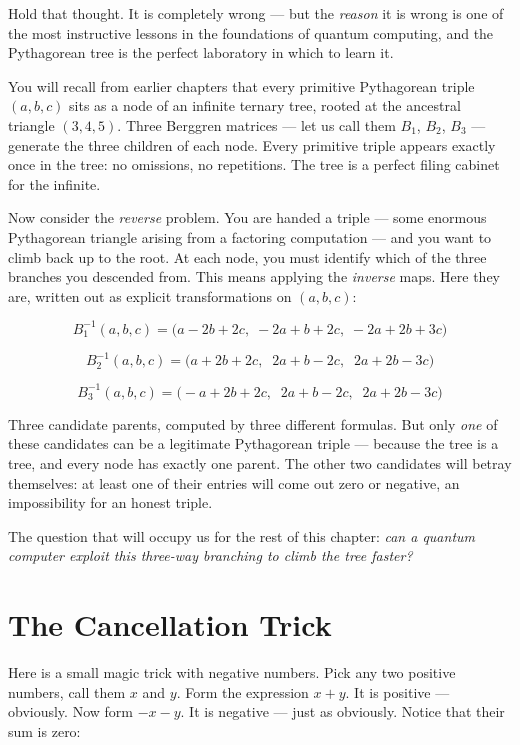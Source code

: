 \documentclass[11pt,twoside,openright]{book}
\theoremstyle{definition}
\theoremstyle{remark}
\begin{document}
Hold that thought. It is completely wrong --- but the \textit{reason} it is wrong is one of the most instructive lessons in the foundations of quantum computing, and the Pythagorean tree is the perfect laboratory in which to learn it.

You will recall from earlier chapters that every primitive Pythagorean triple $(a, b, c)$ sits as a node of an infinite ternary tree, rooted at the ancestral triangle $(3, 4, 5)$. Three Berggren matrices --- let us call them $B_1$, $B_2$, $B_3$ --- generate the three children of each node. Every primitive triple appears exactly once in the tree: no omissions, no repetitions. The tree is a perfect filing cabinet for the infinite.

Now consider the \textit{reverse} problem. You are handed a triple --- some enormous Pythagorean triangle arising from a factoring computation --- and you want to climb back up to the root. At each node, you must identify which of the three branches you descended from. This means applying the \textit{inverse} maps. Here they are, written out as explicit transformations on $(a, b, c)$:

\[B_1^{-1}(a,b,c) = \bigl(a - 2b + 2c,\;-2a + b + 2c,\;-2a + 2b + 3c\bigr)\]

\[B_2^{-1}(a,b,c) = \bigl(a + 2b + 2c,\;\;2a + b - 2c,\;\;2a + 2b - 3c\bigr)\]

\[B_3^{-1}(a,b,c) = \bigl(-a + 2b + 2c,\;\;2a + b - 2c,\;\;2a + 2b - 3c\bigr)\]

Three candidate parents, computed by three different formulas. But only \textit{one} of these candidates can be a legitimate Pythagorean triple --- because the tree is a tree, and every node has exactly one parent. The other two candidates will betray themselves: at least one of their entries will come out zero or negative, an impossibility for an honest triple.



The question that will occupy us for the rest of this chapter: \textit{can a quantum computer exploit this three-way branching to climb the tree faster?}


\section{The Cancellation Trick}

Here is a small magic trick with negative numbers. Pick any two positive numbers, call them $x$ and $y$. Form the expression $x + y$. It is positive --- obviously. Now form $-x - y$. It is negative --- just as obviously. Notice that their sum is zero:
\end{document}
